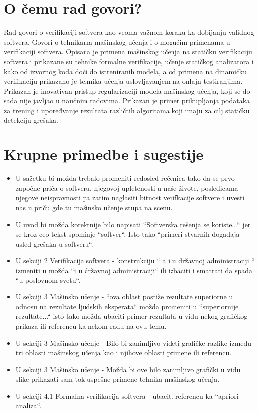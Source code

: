 \documentclass[a4paper]{report}
\begin{document}
\section{O čemu rad govori?}
Rad govori o verifikaciji softvera kao veoma važnom koraku ka dobijanju validnog softvera.
Govori o tehnikama mašinskog učenja i o mogućim primenama u verifikaciji softvera.
Opisana je primena mašinskog učenja na statičku verifikaciju softvera i prikazane su
tehnike formalne verifikacije, učenje statičkog analizatora i kako
od izvornog koda doći do istreniranih modela, a od primena na dinamičku
verifikaciju prikazano je tehnika učenja uslovljavanjem na onlajn testiranjima.
Prikazan je inovativan pristup regularizaciji modela mašinskog učenja, koji se do sada nije javljao
u naučnim radovima. 
Prikazan je primer prikupljanja podataka za trening i upoređvanje rezultata različtih algoritama koji imaju za cilj
statičku detekciju grešaka. 

\section{Krupne primedbe i sugestije}
\begin{itemize}
  \item U sažetku bi možda trebalo promeniti redosled rečenica tako da se prvo započne priča o softveru, njegovoj upletenosti u naše živote, posledicama njegove neispravnosti pa zatim naglasiti bitnost verifkacije softvere i uvesti nas u priču gde tu mašinsko učenje stupa na scenu.
  \item U uvod bi možda korektnije bilo napisati ``Softverska rešenja se koriste...`` jer se kroz ceo tekst spominje ``softver``. Isto tako ``primeri stvarnih događaja usled grešaka u softveru``.
  \item U sekciji 2 Verifikacija softvera - konstrukciju `` a i u državnoj administraciji `` izmeniti u možda ``i u državnoj administraciji`` ili izbaciti i smatrati da spada ``u poslovnom svetu``. 
  \item U sekciji 3 Mašinsko učenje - ``ova oblast postiže rezultate superiorne u odnosu na rezultate ljudskih eksperata`` možda promeniti u ``superiornije rezultate...`` isto tako možda ubaciti primer rezultata u vidu nekog grafičkog prikaza ili referencu ka nekom radu na ovu temu.
  \item U sekciji 3 Mašinsko učenje - Bilo bi zanimljivo videti grafičke razlike između tri oblasti mašinskog učenja kao i njihove oblasti primene ili referencu.
  \item U sekciji 3 Mašinsko učenje - Možda bi ove bilo zanimljivo grafički u vidu slike prikazati sam tok uspešne primene tehnika mašinskog učenja.
  \item U sekciji 4.1 Formalna verifikacija softvera - ubaciti referencu ka ``apriori analiza``.
\end{itemize}
\end{document}

